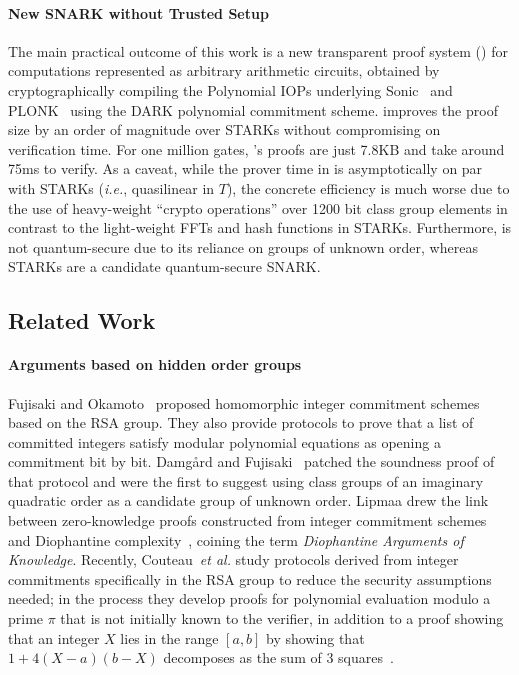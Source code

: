 \paragraph{New SNARK without Trusted Setup}
The main practical outcome of this work is a new transparent proof system () for computations represented as arbitrary arithmetic circuits, obtained by cryptographically compiling the Polynomial IOPs underlying \textsf{Sonic}~\cite{Sonic} and \textsf{PLONK}~\cite{Plonk} using the DARK polynomial commitment scheme.  improves the proof size by an order of magnitude over \textsf{STARK}s without compromising on verification time. For one million gates, 's proofs are just 7.8KB and take around 75ms to verify. %
As a caveat, while the prover time in  is asymptotically on par with \textsf{STARK}s (\emph{i.e.}, quasilinear in $T$), the concrete efficiency is much worse due to the use of heavy-weight ``crypto operations'' over 1200 bit class group elements in contrast to the light-weight FFTs and hash functions in \textsf{STARK}s. Furthermore,  is not quantum-secure due to its reliance on groups of unknown order, whereas \textsf{STARK}s are a candidate quantum-secure SNARK. 

\subsection{Related Work}

\paragraph{Arguments based on hidden order groups} 
Fujisaki and Okamoto~\cite{C:FujOka97} proposed homomorphic integer commitment schemes based on the RSA group. They also provide protocols to prove that a list of committed integers satisfy modular polynomial equations as opening a commitment bit by bit. Damgård and Fujisaki~\cite{AC:DamFuj02} patched the soundness proof of that protocol and were the first to suggest using class groups of an imaginary quadratic order as a candidate group of unknown order. Lipmaa drew the link between zero-knowledge proofs constructed from integer commitment schemes and Diophantine complexity~\cite{AC:Lipmaa03a}, coining the term \emph{Diophantine Arguments of Knowledge}. Recently, Couteau~\emph{et al.} study protocols derived from integer commitments specifically in the RSA group to reduce the security assumptions needed; in the process they develop proofs for polynomial evaluation modulo a prime $\pi$ that is not initially known to the verifier, in addition to a proof showing that an integer $X$ lies in the range $[a,b]$ by showing that $1+4(X-a)(b-X)$ decomposes as the sum of 3 squares~\cite{EC:CouPetPoi17}.

